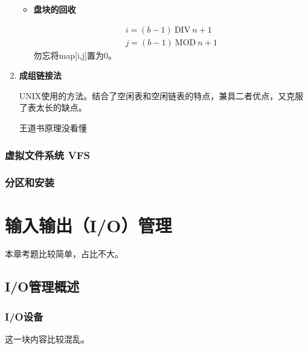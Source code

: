 \documentclass[12pt, a4paper, oneside]{ctexart}
\begin{document}
\begin{enumerate}
\begin{itemize}
    \item {\bf 盘块的回收}
    
    \begin{eqnarray*}
      i=(b-1)\ \text{DIV}\ n + 1 \\
      j=(b-1)\ \text{MOD}\ n + 1
    \end{eqnarray*}
    勿忘将map[i,j]置为0。
  \end{itemize}

  \item {\bf 成组链接法}
  
  UNIX使用的方法。结合了空闲表和空闲链表的特点，兼具二者优点，又克服了表太长的缺点。

  王道书原理没看懂

\end{enumerate}

\subsubsection{虚拟文件系统 VFS}

\subsubsection{分区和安装}

\section{输入输出（I/O）管理}

本章考题比较简单，占比不大。

\subsection{I/O管理概述}

\subsubsection{I/O设备}

这一块内容比较混乱。
\end{document}
